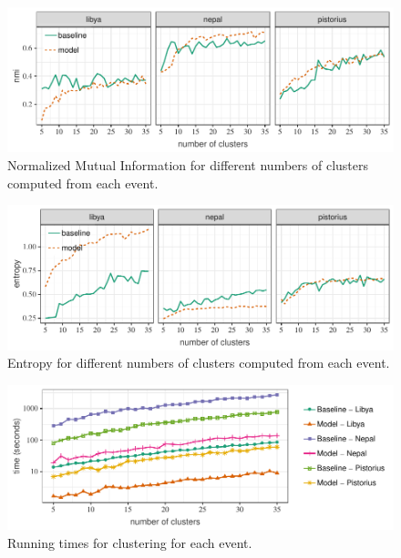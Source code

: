 \begin{figure}
    \centering
    \includegraphics[width=\textwidth]{figures/url-model/nmi} 
    \caption{Normalized Mutual Information for different numbers of clusters computed from each event.}\label{fig:nmi}
\end{figure}

\begin{figure}
  \centering
  \includegraphics[width=\textwidth]{figures/url-model/entropy} 
  \caption{Entropy for different numbers of clusters computed from each event.}\label{fig:entropy}
\end{figure}


\begin{figure}
  \centering
  \includegraphics[width=\textwidth]{figures/url-model/times}
  \caption{Running times for clustering for each event.}\label{fig:times}
\end{figure}%